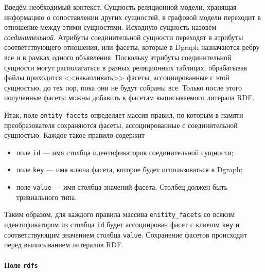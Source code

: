 Введём необходимый контекст. Сущность реляционной модели, хранящая информацию о сопоставлении других сущностей, в
графовой модели переходит в отношение между этими сущностями. Исходную сущность назовём \textit{соединительной}.
Атрибуты соединительной сущности переходят в атрибуты соответствующего отношения, или фасеты, которые в Dgraph
назначаются ребру все и в рамках одного объявления. Поскольку атрибуты соединительной сущности могут располагаться в
разных реляционных таблицах, обрабатывая файлы приходится <<накапливать>> фасеты, ассоциированные с этой сущностью, до
тех пор, пока они не будут собраны все. Только после этого полученные фасеты можны добавить к фасетам выписываемого
литерала RDF.

Итак, поле \texttt{entity\_facets} определяет массив правил, по которым в памяти преобразователя сохраняются фасеты,
ассоциированные с соединительной сущностью. Каждое такое правило содержит
\begin{itemize}
  \item поле \texttt{id} --- имя столбца идентификаторов соединительной сущности;
  \item поле \texttt{key} --- имя ключа фасета, которое будет использоваться в Dgraph;
  \item поле \texttt{value} --- имя столбца значений фасета. Столбец должен быть тривиального типа.
\end{itemize}

Таким образом, для каждого правила массива \texttt{enitity\_facets} со всяким идентификатором из столбца \texttt{id}
будет ассоциирован фасет с ключом \texttt{key} и соответствующим значением столбца \texttt{value}. Сохранение фасетов
происходит перед выписыванием литералов RDF.

\paragraph{Поле \texttt{rdfs}}

